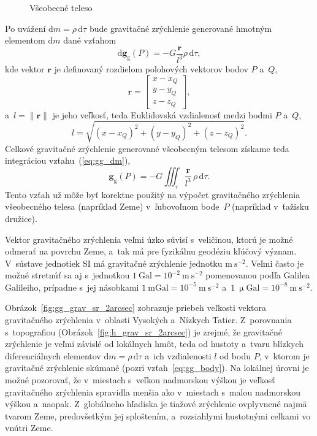 \documentclass[a4paper,12pt]{book}
\newcommand{\diff}{\mathrm d}
\newcommand{\gidx}{\mathrm g}
\let\vec\mathbf
\begin{document}
\begin{figure}
\centering

\caption{Všeobecné teleso}
\label{fig:gravitating_body}
\end{figure}

Po uvážení $\diff m = \rho \, \diff \tau$ bude gravitačné zrýchlenie generované
hmotným elementom $\diff m$ dané vzťahom
%
\begin{equation}
\label{eq:gg_dm}
\diff \vec g_\gidx(P) = -G \frac{\vec r}{l^3} \rho \, \diff\tau{,}
\end{equation}
%
kde vektor $\vec r$ je definovaný rozdielom polohových vektorov bodov $P$
a~$Q$,
%
\begin{equation}
\label{eq:r}
\vec r =
%
\begin{bmatrix}
x - x_Q \\
y - y_Q \\
z - z_Q
\end{bmatrix}
{,}
\end{equation}
%
a~$l = \| \vec r \|$ je jeho veľkosť, teda Euklidovská vzdialenosť medzi bodmi
$P$ a~$Q$,
%
\begin{equation}
\label{eq:l}
l = \sqrt{(x - x_Q)^2 + (y - y_Q)^2 + (z - z_Q)^2}{.}
\end{equation}
%
Celkové gravitačné zrýchlenie generované všeobecným telesom získame teda
integráciou vzťahu~(\ref{eq:gg_dm}),
%
\begin{equation}
\label{eq:gg_body}
\vec g_\gidx(P) = -G \iiint_{\tau} \frac{\vec r}{l^3} \, \rho \, \diff\tau{.}
\end{equation}
%
Tento vzťah už môže byť korektne použitý na výpočet gravitačného zrýchlenia 
všeobecného telesa (napríklad Zeme) v~ľubovoľnom bode~$P$ (napríklad v~ťažisku 
družice).

Vektor gravitačného zrýchlenia veľmi úzko súvisí s~veličinou, ktorú je možné
odmerať na povrchu Zeme, a~tak má pre fyzikálnu geodéziu kľúčový význam.
V~sústave jednotiek SI má gravitačné zrýchlenie jednotku $\mathrm{m}\
\mathrm{s}^{-2}$.  Veľmi často je možné stretnúť sa aj s~jednotkou $1\
\mathrm{Gal} = 10^{-2}\ \mathrm{m}\ \mathrm{s}^{-2}$ pomenovanou podľa Galilea
Galileiho, prípadne s~jej násobkami $1\ \mathrm{mGal} = 10^{-5}\ \mathrm{m}\
\mathrm{s}^{-2}$ a~$1\ \upmu \mathrm{Gal} = 10^{-8}\ \mathrm{m}\
\mathrm{s}^{-2}$.

Obrázok~\ref{fig:gg_grav_sr_2arcsec} zobrazuje priebeh veľkosti vektora
gravitačného zrýchlenia v~oblasti Vysokých a~Nízkych Tatier.  Z~porovnania
s~topografiou (Obrázok~\ref{fig:h_grav_sr_2arcsec}) je zrejmé, že gravitačné
zrýchlenie je veľmi závislé od lokálnych hmôt, teda od hustoty a~tvaru blízkych
diferenciálnych elementov $\diff m = \rho \, \diff \tau$ a~ich vzdialenosti $l$
od bodu $P$, v~ktorom je gravitačné zrýchlenie skúmané (pozri
vzťah~\ref{eq:gg_body}).  Na lokálnej úrovni je možné pozorovať, že v~miestach
s~veľkou nadmorskou výškou je veľkosť gravitačného zrýchlenia spravidla menšia
ako v~miestach s~malou nadmorskou výškou a~naopak.  Z~globálneho hľadiska je
tiažové zrýchlenie ovplyvnené najmä tvarom Zeme, predovšetkým jej sploštením,
a~rozsiahlymi hustotnými celkami vo vnútri Zeme.
\end{document}
